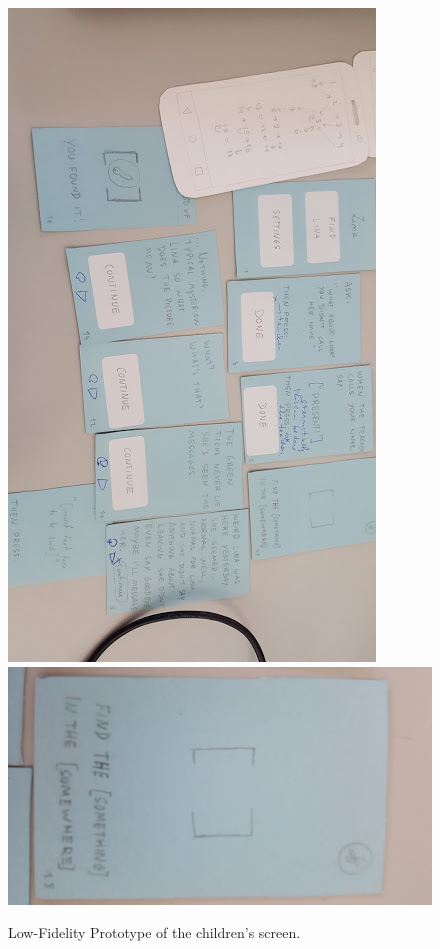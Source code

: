 \documentclass[runningheads]{llncs}
\begin{document}
\begin{figure}
    \centering
    \includegraphics[scale = 0.38, angle = 90]{paper_proto2.jpg}
    \includegraphics[scale = 0.12, angle = 90]{paper_proto4.jpg}
    \caption{Low-Fidelity Prototype of the children's screen.}
    \label{fig:LFPc}
\end{figure}
\end{document}
